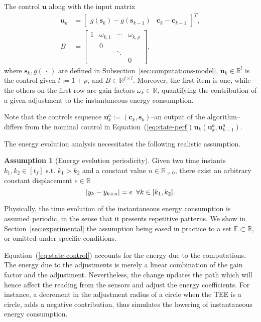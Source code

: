 \documentclass[letterpaper,10pt,conference]{ieeeconf}
\DeclarePairedDelimiter\abs{\lvert}{\rvert}%
\theoremstyle{definition}
\newtheorem{assm}[thm]{Assumption}
\begin{document}
The control $\mathbf{u}$ along with the input matrix
\begin{equation}\label{eq:state-control}\begin{split}  
  \mathbf{u}_k&=\begin{bmatrix}g(\mathbf{s}_k)-g(\mathbf{s}_{k-1}) & \mathbf{c}_k-\mathbf{c}_{k-1}\end{bmatrix}^T,\\
  B&=\left[\begin{array}{cccc}
    1& \omega_{k,1}& \cdots& \omega_{k,\rho}  \\
     &            0&       &  \\
     &             & \ddots&  \\
     &             &       & 0
  \end{array}\right],
\end{split}\end{equation}
where $\mathbf{s}_k,g(\,\cdot\,)$ are defined in Subsection~\ref{sec:computations-model}, $\mathbf{u}_k\in\mathbb{R}^l$ is the control given $l:=1+\rho$, and $B\in\mathbb{R}^{j\times l}$. Moreover, the first item is one, while the others on the first row are gain factors $\omega_{k}\in\mathbb{R}$, quantifying the contribution of a given adjustment to the instantaneous energy consumption. 

Note that the controls sequence $\mathbf{u}_k^a:=(\mathbf{c}_{k},\mathbf{s}_{k})$--an output of the algorithm--differs from the nominal control in Equation~(\ref{eq:state-perf}) $\mathbf{u}_k(\mathbf{u}_k^a,\mathbf{u}_{k-1}^a)$.

The energy evolution analysis necessitates the following realistic assumption.
\begin{assm}[Energy evelution periodicity]\label{assm:periodic} 
Given two time instants $k_1,k_2\in[t_f]$ s.t. $k_1>k_2$ and a constant value $n\in\mathbb{R}_{> 0}$, there exist an arbitrary constant displacement $e\in\mathbb{R}$
\begin{equation}
  \abs{y_{k}-y_{k+n}}= e\,\,\,\forall k\in[k_1,k_2].
\end{equation}
\end{assm}

Physically, the time evolution of the instantaneous energy consumption is assumed periodic, in the sense that it presents repetitive patterns. We show in Section~\ref{sec:experimental} the assumption being eased in practice to a set $\mathbb{E}\subset\mathbb{R}$, or omitted under specific conditions.

Equation~(\ref{eq:state-control}) accounts for the energy due to the computations. The energy due to the adjustments is merely a linear combination of the gain factor and the adjustment. Nevertheless, the change updates the path which will hence affect the reading from the sensors and adjust the energy coefficients. For instance, a decrement in the adjustment radius of a circle when the TEE is a circle, adds a negative contribution, thus simulates the lowering of instantaneous energy consumption.
\end{document}
